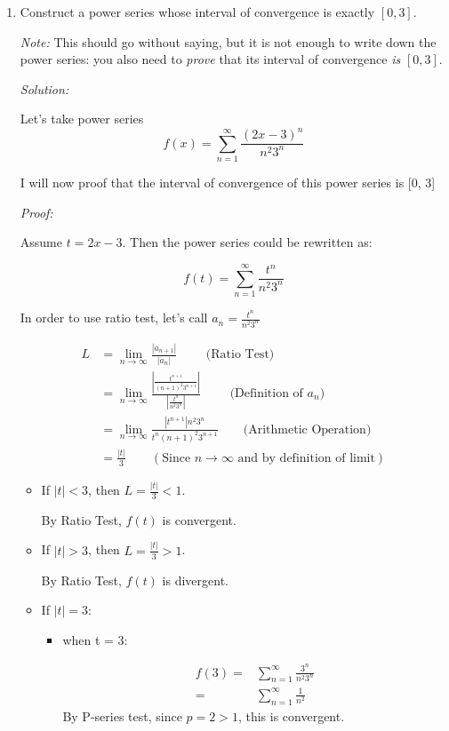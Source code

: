 \documentclass[12pt]{exam}
\newcommand {\DS} [1] {${\displaystyle #1}$}
\begin{document}
\begin{enumerate}

\item Construct a power series whose interval of convergence is exactly \DS{[0,3]}. 

\emph{Note:}  This should go without saying, but it is not enough to write down the power series: you also need to \emph{prove} that its interval of convergence \emph{is} \DS{[0,3].}

\emph{Solution:}

Let's take power series $$f(x) = \sum_{n = 1}^{\infty} \frac{(2x-3)^n}{n^2 3^n}$$

I will now proof that the interval of convergence of this power series is [0, 3]

\emph{Proof:}

Assume $t = 2x - 3$. Then the power series could be rewritten as:

$$f(t) = \sum_{n = 1}^{\infty} \frac{t^n}{n^2 3^n}$$

In order to use ratio test, let's call $a_n =  \frac{t^n}{n^2 3^n}$

\begin{align*}
	L &= \lim_{n \to \infty} \frac{|a_{n + 1}|}{|a_n|} \qquad\mbox{ (Ratio Test) } \\
	&= \lim_{n \to \infty} \frac{|\frac{t^{n + 1}}{(n + 1)^2 3^{n + 1}}|}{|\frac{t^n}{n^2 3^n}|} \qquad\mbox{ (Definition of } a_n ) \\
	&= \lim_{n \to \infty} \frac{|t^{n + 1}| n^2 3^n}{ t^n(n + 1)^2 3^{n + 1}} \qquad\mbox{(Arithmetic Operation)} \\
	&= \frac{|t|}{3} \qquad( \mbox{Since } n \to \infty \mbox{ and by definition of limit})
\end{align*}

\begin{itemize}
	\item If $|t| < 3$, then $L = \frac{|t|}{3} < 1$.

	By Ratio Test, $f(t)$ is convergent.

	\item If $|t| > 3$, then $L = \frac{|t|}{3} > 1$.

	By Ratio Test, $f(t)$ is divergent.

	\item If $|t| = 3$:

	\begin{itemize}
		\item when t = 3:

		\begin{align*}
			f(3) 
			=& \sum_{n = 1}^{\infty} \frac{3^n}{n^2 3^n} \\
			=& \sum_{n = 1}^{\infty} \frac{1}{n^2}
		\end{align*}
		By P-series test, since $p=2 > 1$, this is convergent.
		

\end{itemize}
\end{itemize}
\end{enumerate}
\end{document}
